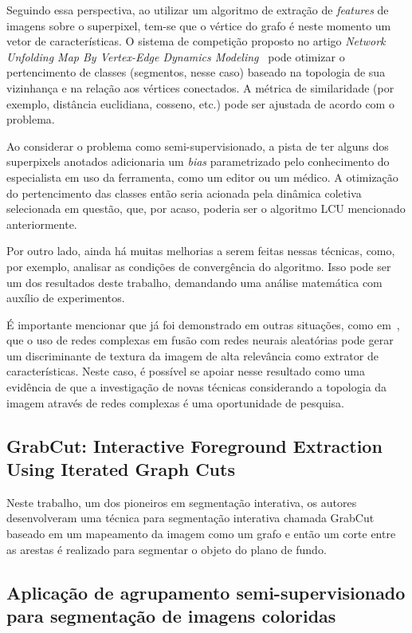 Seguindo essa perspectiva, ao utilizar um algoritmo de extração de
\textit{features} de imagens sobre o superpixel, tem-se que o vértice
do grafo é neste momento um vetor de características. O sistema de
competição proposto no artigo \textit{Network Unfolding Map By
Vertex-Edge Dynamics Modeling}~\cite{VerriNetworkUnfoldingMap2018}
pode otimizar o pertencimento de classes (segmentos, nesse caso)
baseado na topologia de sua vizinhança e na relação aos vértices
conectados. A métrica de similaridade (por exemplo, distância
euclidiana, cosseno, etc.) pode ser ajustada de acordo com o problema.

Ao considerar o problema como semi-supervisionado, a pista de ter
alguns dos superpixels anotados adicionaria um \textit{bias}
parametrizado pelo conhecimento do especialista em uso da ferramenta,
como um editor ou um médico. A otimização do pertencimento das classes
então seria acionada pela dinâmica coletiva selecionada em questão,
que, por acaso, poderia ser o algoritmo \gls{LCU} mencionado anteriormente.

Por outro lado, ainda há muitas melhorias a serem feitas nessas técnicas, como,
por exemplo, analisar as condições de convergência do algoritmo. Isso
pode ser um dos resultados deste trabalho, demandando uma análise
matemática com auxílio de experimentos.

É importante mencionar que já foi demonstrado em outras situações,
como em~\cite{JarbasComplexNetworks2020}, que o uso de redes complexas
em fusão com redes neurais aleatórias pode gerar um discriminante de
textura da imagem de alta relevância como extrator de
características. Neste caso, é possível se apoiar nesse resultado como
uma evidência de que a investigação de novas técnicas considerando a
topologia da imagem através de redes complexas é uma oportunidade de
pesquisa.


\subsection{GrabCut: Interactive Foreground Extraction Using Iterated
  Graph Cuts}\label{sec:grabcut}

Neste trabalho, um dos pioneiros em segmentação interativa, os
autores~\cite{rother2004grabcut} desenvolveram uma técnica para segmentação interativa
chamada GrabCut baseado em um mapeamento da imagem como um grafo e
então um corte entre as arestas é realizado para segmentar o objeto do
plano de fundo.


\subsection{Aplicação de agrupamento semi-supervisionado para segmentação
  de imagens coloridas}\label{sec:franciscolira2018}

